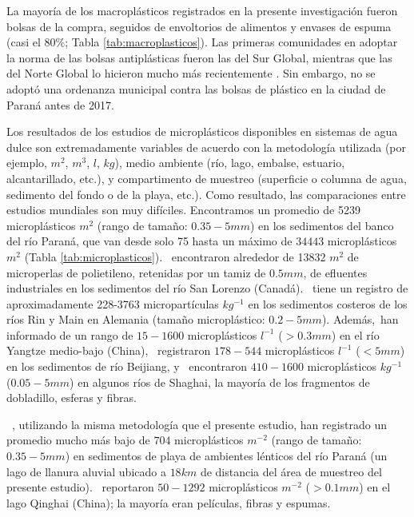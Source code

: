 La mayoría de los macroplásticos registrados en la presente investigación fueron bolsas de la compra, seguidos de envoltorios de alimentos y envases de espuma (casi el $80\%$; Tabla \ref{tab:macroplasticos}). Las primeras comunidades en adoptar la norma de las bolsas antiplásticas fueron las del Sur Global, mientras que las del Norte Global lo hicieron mucho más recientemente \parencite{Clapp2009}. Sin embargo, no se adoptó una ordenanza municipal contra las bolsas de plástico en la ciudad de Paraná antes de 2017.

Los resultados de los estudios de microplásticos disponibles en sistemas de agua dulce son extremadamente variables de acuerdo con la metodología utilizada (por ejemplo, $m^{2}$, $m^{3}$, $l$, $kg$), medio ambiente (río, lago, embalse, estuario, alcantarillado, etc.), y compartimento de muestreo (superficie o columna de agua, sedimento del fondo o de la playa, etc.). Como resultado, las comparaciones entre estudios mundiales son muy difíciles. Encontramos un promedio de 5239 microplásticos $m^{2}$ (rango de tamaño: $0.35-5 mm$) en los sedimentos del banco del río Paraná, que van desde solo 75 hasta un máximo de $34443$ microplásticos $m^{2}$ (Tabla \ref{tab:microplasticos}).~\cite{doi:10.1139/cjfas-2014-0281} encontraron alrededor de 13832 $m^{2}$ de microperlas de polietileno, retenidas por un tamiz de $0.5mm$, de efluentes industriales en los sedimentos del río San Lorenzo (Canadá).~\cite{Klein2015} tiene un registro de aproximadamente 228-3763 micropartículas $kg^{-1}$ en los sedimentos costeros de los ríos Rin y Main en Alemania (tamaño microplástico: $0.2-5mm$). Además,~\cite{SU2016711}han informado de un rango de $15-1600$ microplásticos $l^{-1}$ ($>0.3 mm$) en el río Yangtze medio-bajo (China),~\cite{WANG20171369} registraron $178-544$ microplásticos $l^{-1}$ ($<5 mm$) en los sedimentos de río Beijiang, y~\cite{PENG2017283} encontraron $410-1600$ microplásticos $kg^{-1}$ ($0.05-5 mm$) en algunos ríos de Shaghai, la mayoría de los fragmentos de dobladillo, esferas y fibras.

~\cite{Blettler2017}, utilizando la misma metodología que el presente estudio, han registrado un promedio mucho más bajo de $704$ microplásticos $m^{-2}$ (rango de tamaño: $0.35-5mm$) en sedimentos de playa de ambientes lénticos del río Paraná (un lago de llanura aluvial ubicado a $18 km$ de distancia del área de muestreo del presente estudio).~\cite{XIONG2018899} reportaron $50-1292$ microplásticos $m^{-2}$ ($>0.1mm$) en el lago Qinghai (China); la mayoría eran películas, fibras y espumas.

